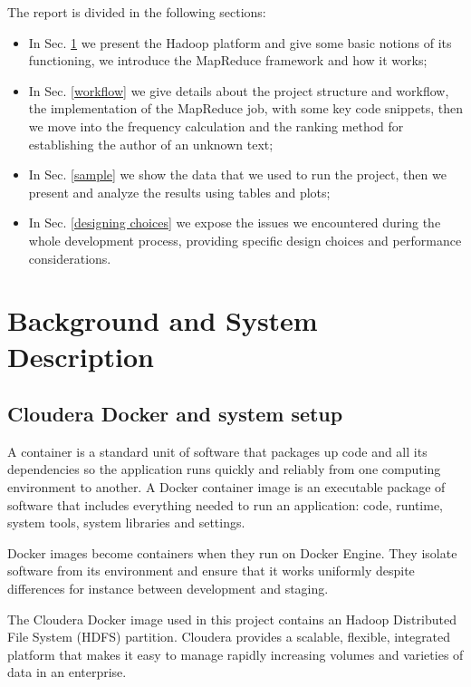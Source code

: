 \documentclass[a4paper,11pt, twoside]{article}
\begin{document}
	\noindent
	The report is divided in the following sections: 
	\begin{itemize}
		\item In Sec. \ref{backg} we present the Hadoop platform and give some basic notions of its functioning, we introduce the MapReduce framework and how it works;
		\item In Sec. \ref{workflow} we give details about the project structure and workflow, the implementation of the MapReduce job, with some key code snippets, then we move into the frequency calculation and the ranking method for establishing the author of an unknown text;
		\item In Sec. \ref{sample} we show the data that we used to run the project, then we present and analyze the results using tables and plots;
		\item In Sec. \ref{designing choices} we expose the issues we encountered during the whole development process, providing specific design choices and performance considerations.
	\end{itemize}

	\section{Background and System Description}\label{backg}
    \subsection{Cloudera Docker and system setup}
		A container is a standard unit of software that packages up code and all its dependencies so the application runs quickly and reliably from one computing environment to another. A Docker container image is an executable package of software that includes everything needed to run an application: code, runtime, system tools, system libraries and settings.

		\bigskip

		\noindent
		Docker images become containers when they run on Docker Engine. They isolate software from its environment and ensure that it works uniformly despite differences for instance between development and staging.
		
		\bigskip

		\noindent
		The Cloudera\parencite{Cloudera} Docker image used in this project contains an Hadoop Distributed File System (HDFS) partition. Cloudera provides a scalable, flexible, integrated platform that makes it easy to manage rapidly increasing volumes and varieties of data in an enterprise. 
\end{document}

